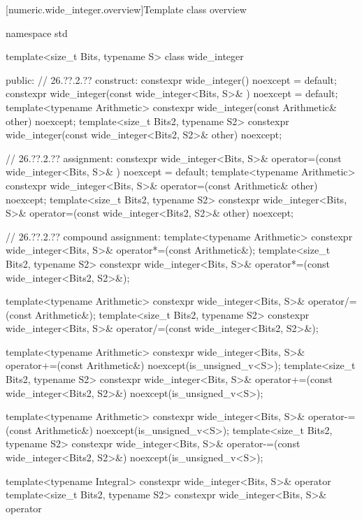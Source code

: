 [numeric.wide_integer.overview]{Template class  overview}
       
\begin{codeblock}
namespace std {
  template<size_t Bits, typename S>
  class wide_integer {
  public:
    // 26.??.2.?? construct:
    constexpr wide_integer() noexcept = default;
    constexpr wide_integer(const wide_integer<Bits, S>& ) noexcept = default;
    template<typename Arithmetic> constexpr wide_integer(const Arithmetic& other) noexcept;
    template<size_t Bits2, typename S2> constexpr wide_integer(const wide_integer<Bits2, S2>& other) noexcept;

    // 26.??.2.?? assignment:
    constexpr wide_integer<Bits, S>& operator=(const wide_integer<Bits, S>& ) noexcept = default;
    template<typename Arithmetic>
      constexpr wide_integer<Bits, S>& operator=(const Arithmetic& other) noexcept;
    template<size_t Bits2, typename S2>
      constexpr wide_integer<Bits, S>& operator=(const wide_integer<Bits2, S2>& other) noexcept;
    
    // 26.??.2.?? compound assignment:
    template<typename Arithmetic>
      constexpr wide_integer<Bits, S>& operator*=(const Arithmetic&);
    template<size_t Bits2, typename S2>
      constexpr wide_integer<Bits, S>& operator*=(const wide_integer<Bits2, S2>&);
    
    template<typename Arithmetic>
      constexpr wide_integer<Bits, S>& operator/=(const Arithmetic&);
    template<size_t Bits2, typename S2>
      constexpr wide_integer<Bits, S>& operator/=(const wide_integer<Bits2, S2>&);
    
    template<typename Arithmetic>
      constexpr wide_integer<Bits, S>& operator+=(const Arithmetic&) noexcept(is_unsigned_v<S>);
    template<size_t Bits2, typename S2>
      constexpr wide_integer<Bits, S>& operator+=(const wide_integer<Bits2, S2>&) noexcept(is_unsigned_v<S>);
    
    template<typename Arithmetic>
      constexpr wide_integer<Bits, S>& operator-=(const Arithmetic&) noexcept(is_unsigned_v<S>);
    template<size_t Bits2, typename S2>
      constexpr wide_integer<Bits, S>& operator-=(const wide_integer<Bits2, S2>&) noexcept(is_unsigned_v<S>);
    
    template<typename Integral>
      constexpr wide_integer<Bits, S>& operator%
    template<size_t Bits2, typename S2>
      constexpr wide_integer<Bits, S>& operator%
    
}}
\end{codeblock}
